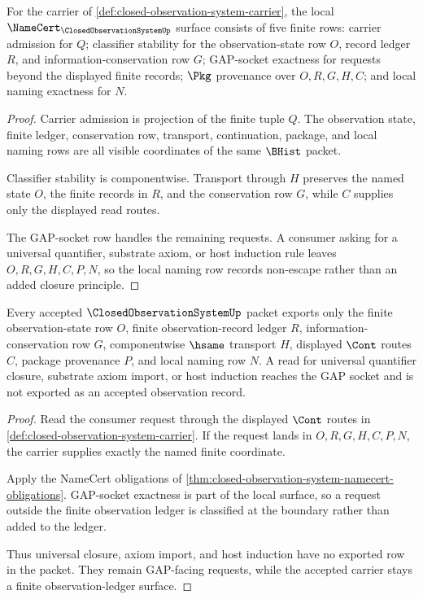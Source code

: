 \begin{theorem}
\label{thm:closed-observation-system-namecert-obligations}
For the carrier of \autoref{def:closed-observation-system-carrier}, the local $\NameCert_{\ClosedObservationSystemUp}$ surface consists of five finite rows: carrier admission for $Q$; classifier stability for the observation-state row $O$, record ledger $R$, and information-conservation row $G$; GAP-socket exactness for requests beyond the displayed finite records; $\Pkg$ provenance over $O,R,G,H,C$; and local naming exactness for $N$.
\end{theorem}
\begin{proof}
Carrier admission is projection of the finite tuple $Q$. The observation state, finite ledger, conservation row, transport, continuation, package, and local naming rows are all visible coordinates of the same $\BHist$ packet.

Classifier stability is componentwise. Transport through $H$ preserves the named state $O$, the finite records in $R$, and the conservation row $G$, while $C$ supplies only the displayed read routes.

The GAP-socket row handles the remaining requests. A consumer asking for a universal quantifier, substrate axiom, or host induction rule leaves $O,R,G,H,C,P,N$, so the local naming row records non-escape rather than an added closure principle.
\end{proof}

\begin{theorem}
\label{thm:closed-observation-system-gap-socket-nonescape}
Every accepted $\ClosedObservationSystemUp$ packet exports only the finite observation-state row $O$, finite observation-record ledger $R$, information-conservation row $G$, componentwise $\hsame$ transport $H$, displayed $\Cont$ routes $C$, package provenance $P$, and local naming row $N$. A read for universal quantifier closure, substrate axiom import, or host induction reaches the GAP socket and is not exported as an accepted observation record.
\end{theorem}
\begin{proof}
Read the consumer request through the displayed $\Cont$ routes in \autoref{def:closed-observation-system-carrier}. If the request lands in $O,R,G,H,C,P,N$, the carrier supplies exactly the named finite coordinate.

Apply the NameCert obligations of \autoref{thm:closed-observation-system-namecert-obligations}. GAP-socket exactness is part of the local surface, so a request outside the finite observation ledger is classified at the boundary rather than added to the ledger.

Thus universal closure, axiom import, and host induction have no exported row in the packet. They remain GAP-facing requests, while the accepted carrier stays a finite observation-ledger surface.
\end{proof}

